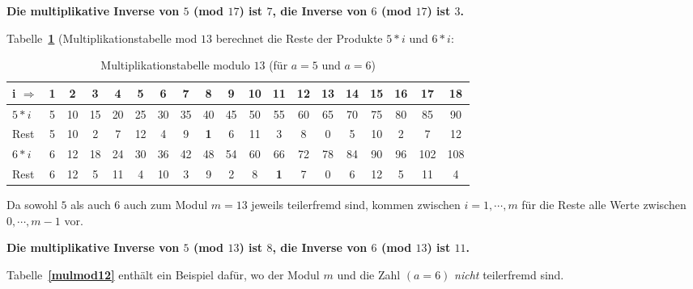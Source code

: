 \begin{refsegment}
\textbf{Die multiplikative Inverse von $5$ (mod $17$)
ist $7$, die Inverse von $6$ (mod $17$) ist $3$.}




Tabelle~\textbf{\ref{mulmod13}} (Multiplikationstabelle mod $13$
berechnet die Reste der Produkte $5*i$ und $6*i$:
\begin{table}[ht] \label{SrcArith1b}
\begin{center}                                                                  \begin{tabular}{|l@{\:}||c|c|c|c|c|c|c|c|c|c|c|c||c|c|c|c|c|c|}
\hline
i $\Rightarrow$      & 1  & 2  & 3  & 4  & 5  & 6  & 7  & 8  & 9 & 10 & 11 & 12 & 13 & 14 & 15 & 16  & 17  & 18\\
\hline
\hline
$5*i$                 & 5 & 10 & 15 & 20 & 25 & 30 & 35 & 40 & 45 & 50 & 55 & 60 & 65 & 70 & 75 & 80  & 85  & 90\\
Rest                 & 5 & 10  & 2  & 7  & 12  & 4 & 9  & \textbf{1}  & 6  & 11 & 3  & 8  & 0 & 5  & 10  & 2   & 7   & 12\\
\hline
$6*i$                  & 6 & 12 & 18 & 24 & 30 & 36 & 42 & 48 & 54 & 60 & 66 & 72 & 78 & 84 & 90 & 96 & 102 & 108\\
Rest                 & 6  & 12  & 5  & 11  & 4  & 10  & 3  & 9  & 2  & 8  & \textbf{1}  & 7  & 0  & 6  & 12  & 5   & 11   & 4\\
\hline
\end{tabular}
\end{center}
\caption{Multiplikationstabelle modulo $13$ (für $a=5$ und $a=6$)}
\label{mulmod13}
\end{table}

Da sowohl $5$ als auch $6$ auch zum Modul $m=13$ jeweils
teilerfremd sind, kommen
zwischen $i=1, \cdots, m$ für die Reste alle Werte zwischen
$0, \cdots, m-1$ vor.


\textbf{Die multiplikative Inverse von $5$ (mod $13$)
ist $8$, die Inverse von $6$ (mod $13$) ist $11$.}



Tabelle~\textbf{\ref{mulmod12}} enthält ein Beispiel dafür, wo der
Modul $m$ und die Zahl $(a=6)$ {\em nicht} teilerfremd sind.


\end{refsegment}
